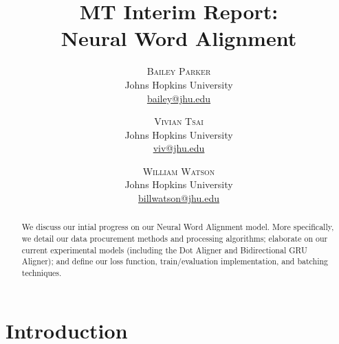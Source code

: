 \documentclass[twoside,twocolumn]{article}
\title{MT Interim Report: \\ Neural Word Alignment}
\author{%
\textsc{Bailey Parker} \\[1ex]
\normalsize Johns Hopkins University \\
\normalsize \href{mailto:bailey@jhu.edu}{bailey@jhu.edu}
 \and
 \textsc{Vivian Tsai} \\[1ex]
\normalsize Johns Hopkins University \\
\normalsize \href{mailto:viv@jhu.edu}{viv@jhu.edu}
 \and
  \textsc{William Watson} \\[1ex]
\normalsize Johns Hopkins University \\
\normalsize \href{mailto:billwatson@jhu.edu}{billwatson@jhu.edu}
}
\date{}
\begin{document}
\maketitle




\begin{abstract}
We discuss our intial progress on our Neural Word Alignment model. More
specifically, we detail our data procurement methods and processing algorithms;
elaborate on our current experimental models (including the Dot Aligner and
Bidirectional GRU Aligner); and define our loss function, train/evaluation
implementation, and batching techniques.
\end{abstract}

\section{Introduction}

\end{document}
